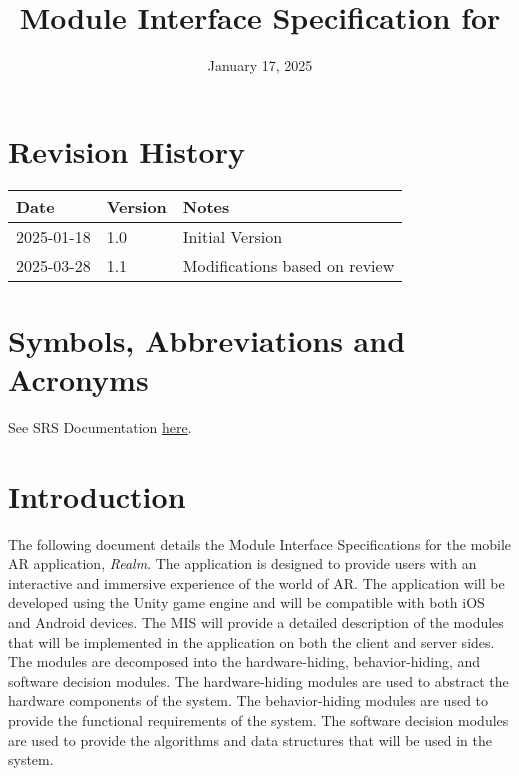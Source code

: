 \documentclass[12pt, titlepage]{article}
\begin{document}
\title{Module Interface Specification for \progname{}}

\author{\authname}

\date{January 17, 2025}

\maketitle


\section{Revision History}

\begin{tabularx}{\textwidth}{p{3cm}p{2cm}X}
  \toprule {\bf Date} & {\bf Version} & {\bf Notes} \\
  \midrule
  2025-01-18              & 1.0           & Initial Version       \\
  \midrule
  2025-03-28              & 1.1           & Modifications based on review       \\
  \bottomrule
\end{tabularx}

\newpage

\section{Symbols, Abbreviations and Acronyms}

See SRS Documentation \href{https://github.com/russellrd/realm/blob/main/docs/SRS-IEEE/SRS.pdf}{here}.

\newpage

\tableofcontents

\newpage


\section{Introduction}

The following document details the Module Interface Specifications for the mobile AR application, \textit{Realm}. The application is designed to provide users with an interactive and immersive experience of the world of AR. The application will be developed using the Unity game engine and will be compatible with both iOS and Android devices. The MIS will provide a detailed description of the modules that will be implemented in the application on both the client and server sides. The modules are decomposed into the hardware-hiding, behavior-hiding, and software decision modules. The hardware-hiding modules are used to abstract the hardware components of the system. The behavior-hiding modules are used to provide the functional requirements of the system. The software decision modules are used to provide the algorithms and data structures that will be used in the system. \\
\end{document}

